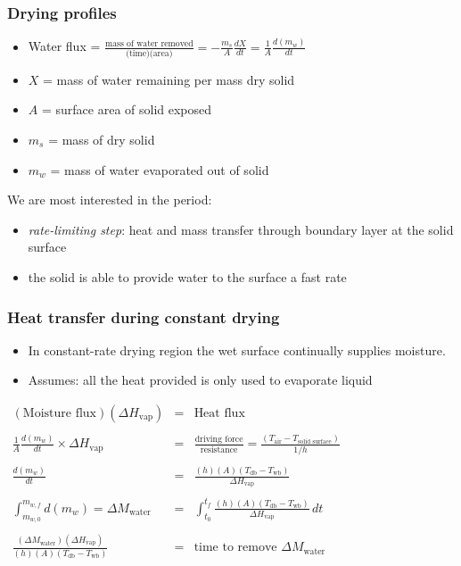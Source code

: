 \begin{frame}\frametitle{Drying profiles}
	\begin{itemize}
		\item	Water flux = $\displaystyle \frac{\text{mass of water removed}}{\text{(time)(area)}} = - \displaystyle \frac{m_s}{A} \frac{dX}{dt} = \frac{1}{A} \frac{d(m_w)}{dt}$
		\item	$X$ = mass of water remaining per mass dry solid
		\item	$A$ = surface area of solid exposed
		\item	$m_s$ = mass of dry solid
		\item	$m_w$ = mass of water evaporated out of solid
	\end{itemize}
	\vspace{12pt}
	We are most interested in the {\color{purple}{constant drying-rate}} period:
	\begin{itemize}
		\item	\emph{rate-limiting step}: heat and mass transfer through boundary layer at the solid surface
		\item	the solid is able to provide water to the surface a fast rate
	\end{itemize}
\end{frame}

\begin{frame}\frametitle{Heat transfer during constant drying}
	\begin{itemize}
		\item	In constant-rate drying region the wet surface continually supplies moisture.
		\item	{\color{myOrange}Assumes}: all the heat provided is only used to evaporate liquid
	\end{itemize}
	\vspace{12pt}
	$\begin{array}{rcl}
		(\text{Moisture flux})(\Delta H_\text{vap})  							&=& \text{Heat flux}\\
		\\
		\displaystyle\frac{1}{A} \frac{d(m_w)}{dt} \times \Delta H_\text{vap} 	&=& \displaystyle\frac{\text{driving force}}{\text{resistance}} = \displaystyle\frac{(T_\text{air} - T_\text{solid surface}) }{1/h} \\
		\\
		\displaystyle \frac{d(m_w)}{dt}   										&=& \displaystyle\frac{(h)(A)(T_\text{db} - T_\text{wb})}{\Delta H_\text{vap}}  \\
		\\
		\displaystyle \int_{m_{w,0}}^{m_{w,f}}{d(m_w)} = \Delta M_\text{water}	&=& \displaystyle \int_{t_0}^{t_f}{\frac{(h)(A)(T_\text{db} - T_\text{wb})}{\Delta H_\text{vap}}\, dt} \\
		\\
		\displaystyle  \frac{(\Delta M_\text{water}) (\Delta H_\text{vap})}{(h)(A)(T_\text{db} - T_\text{wb})} &=& \text{time to remove $\Delta M_\text{water}$}
	\end{array}$
\end{frame}

